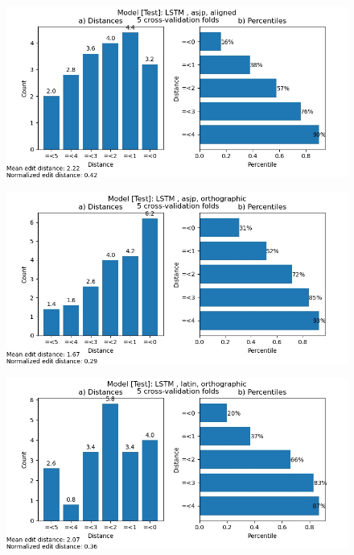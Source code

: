 \begin{figure}
    \centering
    \includegraphics[width=\textwidth]{many2one_test_asjp_aligned.jpg}
    \label{fig:smtaa}
\end{figure}

\begin{figure}
    \centering
    \includegraphics[width=\textwidth]{many2one_test_asjp_ortho.jpg}
    \label{fig:smtao}
\end{figure}

\begin{figure}
    \centering
    \includegraphics[width=\textwidth]{many2one_test_latin_ortho.jpg}
    \label{fig:smtlo}
\end{figure}

